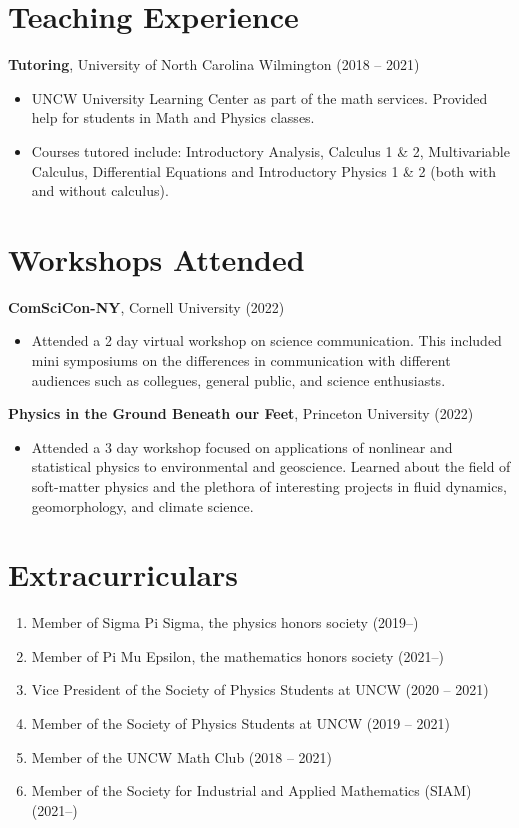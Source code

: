 \documentclass[12pt]{article}
\begin{document}
\section{Teaching Experience }
\textbf{Tutoring}, University of North Carolina Wilmington \hfill (2018 -- 2021)
\begin{itemize}
    \itemsep = 0em
    \item UNCW University Learning Center as part of the math services. Provided help for students in Math and Physics classes.
    \item Courses tutored include: Introductory Analysis, Calculus 1 \& 2, Multivariable Calculus, Differential Equations and Introductory Physics 1 \& 2 (both with and without calculus).
\end{itemize}

\section{Workshops Attended}
\textbf{ComSciCon-NY}, Cornell University \hfill (2022)
\begin{itemize}
    \itemsep = 0em
    \item Attended a 2 day virtual workshop on science communication. This included mini symposiums on the differences in communication with different audiences such as collegues, general public, and science enthusiasts.
\end{itemize}

\textbf{Physics in the Ground Beneath our Feet}, Princeton University \hfill (2022)
\begin{itemize}
    \itemsep = 0em
    \item Attended a 3 day workshop focused on applications of nonlinear and statistical physics to environmental and geoscience. Learned about the field of soft-matter physics and the plethora of interesting projects in fluid dynamics, geomorphology, and climate science.
\end{itemize}


\section{Extracurriculars}
\begin{enumerate}
    \itemsep = 0em
    \item Member of Sigma Pi Sigma, the physics honors society \hfill (2019--)
    \item Member of Pi Mu Epsilon, the mathematics honors society \hfill (2021--)
    \item Vice President of the Society of Physics Students at UNCW \hfill (2020 -- 2021)
    \item Member of the Society of Physics Students at UNCW \hfill (2019 -- 2021)
    \item Member of the UNCW Math Club \hfill (2018 -- 2021)
    \item Member of the Society for Industrial and Applied Mathematics (SIAM) \hfill (2021--)
\end{enumerate}
\end{document}
